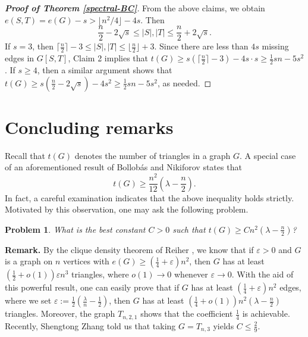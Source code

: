 \documentclass[11pt]{article}
\newtheorem{problem}[theorem]{Problem}
\begin{document}
\begin{proof}[{\bf Proof of Theorem \ref{spectral-BC}}]
From the above claims,  
we obtain 
$e(S,T)= e(G) - s > \lfloor n^2/4\rfloor - 4s$. Then 
\[ \frac{n}{2} - 2 \sqrt{s} \le |S|, |T| \le \frac{n}{2} +2 \sqrt{s}. \]  
If $s=3$, then $\lceil \frac{n}{2} \rceil -3\le 
|S|,|T|\le \lfloor \frac{n}{2} \rfloor +3$.  
Since there are less than $4s$ missing edges in $G[S,T]$, Claim 2 implies that 
$ t(G)\ge s(\lceil \frac{n}{2} \rceil -3) -4s \cdot s 
\ge \frac{1}{2}sn - 5s^2$. 
If $s\ge 4$, then a similar argument shows that $t(G)\ge s(\frac{n}{2} - 2\sqrt{s}) - 4s^2 \ge \frac{1}{2}sn - 5s^2$, as needed. 
\end{proof}






\section{Concluding remarks}

\label{sec7}


Recall that $t(G)$ denotes the number of triangles in a graph $G$. 
A special case of an aforementioned 
result of Bollob\'{a}s and Nikiforov \cite{BN2007jctb} 
states that 
\[  t(G) \ge \frac{n^2}{12}\left( \lambda -\frac{n}{2}\right). \]
In fact, a careful examination indicates that the above inequality holds strictly. Motivated by this observation, 
one may ask the following problem. 


\begin{problem} 
What is the best constant $C>0$ such that $ t(G) \ge C n^2 \left(\lambda - \frac{n}{2} \right)$?
\end{problem}

\noindent 
{\bf Remark.} 
By the clique density theorem of Reiher \cite{Rei2016}, 
we know that if $\varepsilon >0$ and $G$ is a graph on $n$ vertices with $e(G)\ge (\frac{1}{4} + \varepsilon)n^2$, then $G$ has at least 
$(\frac{1}{2} + o(1)) \varepsilon n^3$ triangles, where $o(1)\to 0$ whenever 
$\varepsilon \to 0$. With the aid of this powerful result, 
one can easily prove that if $G$ has at least $(\frac{1}{4} + \varepsilon )n^2$ edges, where we set $\varepsilon := \frac{1}{2}(\frac{\lambda}{n} - \frac{1}{2})$, then $G$ has at least $(\frac{1}{4} + o(1))n^2(\lambda - \frac{n}{2})$ triangles. Moreover, the graph $T_{n,2,1}$ shows 
that the coefficient $\frac{1}{4}$ is achievable. 
Recently, Shengtong Zhang told us that taking $G=T_{n,3}$ yields $C\le \frac{2}{9}$. 
\end{document}
